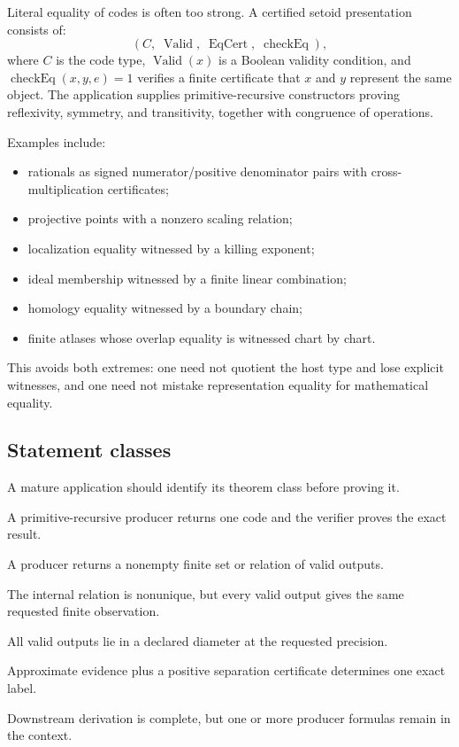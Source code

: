 Literal equality of codes is often too strong.  A certified setoid presentation consists of:
\[
 (C,\;\operatorname{Valid},\;\operatorname{EqCert},\;\operatorname{checkEq}),
\]
where \(C\) is the code type, \(\operatorname{Valid}(x)\) is a Boolean validity condition, and \(\operatorname{checkEq}(x,y,e)=1\) verifies a finite certificate that \(x\) and \(y\) represent the same object.  The application supplies primitive-recursive constructors proving reflexivity, symmetry, and transitivity, together with congruence of operations.

Examples include:
\begin{itemize}
\item rationals as signed numerator/positive denominator pairs with cross-multiplication certificates;
\item projective points with a nonzero scaling relation;
\item localization equality witnessed by a killing exponent;
\item ideal membership witnessed by a finite linear combination;
\item homology equality witnessed by a boundary chain;
\item finite atlases whose overlap equality is witnessed chart by chart.
\end{itemize}

This avoids both extremes: one need not quotient the host type and lose explicit witnesses, and one need not mistake representation equality for mathematical equality.

\subsection{Statement classes}

A mature application should identify its theorem class before proving it.

\begin{description}[style=nextline]
\item[Deterministic theorem.] A primitive-recursive producer returns one code and the verifier proves the exact result.
\item[Bounded relational theorem.] A producer returns a nonempty finite set or relation of valid outputs.
\item[Stable-observable theorem.] The internal relation is nonunique, but every valid output gives the same requested finite observation.
\item[Approximate theorem.] All valid outputs lie in a declared diameter at the requested precision.
\item[Gap-conditional exact theorem.] Approximate evidence plus a positive separation certificate determines one exact label.
\item[Residual conditional theorem.] Downstream derivation is complete, but one or more producer formulas remain in the context.
\end{description}

